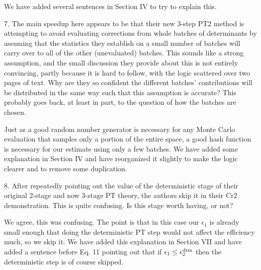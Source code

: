 \documentclass[
preprint,
onecolumn,
 superscriptaddress,
 amsmath,amssymb,
 aps,
]{revtex4-1}
\begin{document}
We have added several sentences in Section IV to try to explain this.

\vskip 5mm {\color{blue}
7. The main speedup here appears to be that their new 3-step PT2 method is attempting to avoid
evaluating corrections from whole batches of determinants by assuming that the statistics
they establish on a small number of batches will carry over to all of the other (unevaluated)
batches. This sounds like a strong assumption, and the small discussion they provide about
this is not entirely convincing, partly because it is hard to follow, with the logic scattered
over two pages of text. Why are they so confident the different batches' contributions will
be distributed in the same way such that this assumption is accurate? This probably goes back,
at least in part, to the question of how the batches are chosen.
}\color{black}

Just as a good random number generator is necessary for any Monte Carlo evaluation that samples
only a portion of the entire space, a good hash function is necessary for our estimate using
only a few batches.  We have added some explanation in Section IV and have reorganized it
slightly to make the logic clearer and to remove some duplication.

\vskip 5mm {\color{blue}
8. After repeatedly pointing out the value of the deterministic stage of their original
2-stage and now 3-stage PT theory, the authors skip it in their Cr2 demonstration. This is
quite confusing. Is this stage worth having, or not?
}\color{black}

We agree, this was confusing.  The point is that in this case our $\epsilon_1$ is already
small enough that doing the deterministic PT step would not affect the efficiency much,
so we skip it.  We have added this explanation in Section VII and have added a sentence
before Eq. 11 pointing out that if $\epsilon_1 \le \epsilon_2^{\rm dtm}$ then the deterministic
step is of course skipped.
\end{document}
